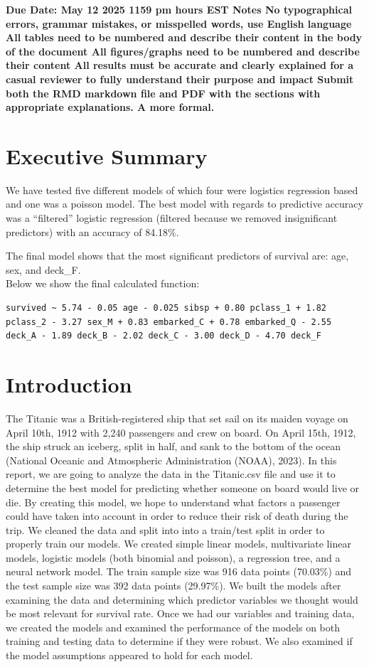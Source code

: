 \documentclass[
  letterpaper,
  DIV=11,
  numbers=noendperiod]{scrartcl}
\begin{document}
\textbf{Due Date: May 12 2025 1159 pm hours EST Notes No typographical
errors, grammar mistakes, or misspelled words, use English language All
tables need to be numbered and describe their content in the body of the
document All figures/graphs need to be numbered and describe their
content All results must be accurate and clearly explained for a casual
reviewer to fully understand their purpose and impact Submit both the
RMD markdown file and PDF with the sections with appropriate
explanations. A more formal.}

\section{Executive Summary}\label{executive-summary}

We have tested five different models of which four were logistics
regression based and one was a poisson model. The best model with
regards to predictive accuracy was a ``filtered'' logistic regression
(filtered because we removed insignificant predictors) with an accuracy
of 84.18\%.

The final model shows that the most significant predictors of survival
are: age, sex, and deck\_F.\\
Below we show the final calculated function:

\begin{verbatim}
survived ~ 5.74 - 0.05 age - 0.025 sibsp + 0.80 pclass_1 + 1.82 pclass_2 - 3.27 sex_M + 0.83 embarked_C + 0.78 embarked_Q - 2.55 deck_A - 1.89 deck_B - 2.02 deck_C - 3.00 deck_D - 4.70 deck_F
\end{verbatim}

\section{Introduction}\label{introduction}

The Titanic was a British-registered ship that set sail on its maiden
voyage on April 10th, 1912 with 2,240 passengers and crew on board. On
April 15th, 1912, the ship struck an iceberg, split in half, and sank to
the bottom of the ocean (National Oceanic and Atmospheric Administration
(NOAA), 2023). In this report, we are going to analyze the data in the
Titanic.csv file and use it to determine the best model for predicting
whether someone on board would live or die. By creating this model, we
hope to understand what factors a passenger could have taken into
account in order to reduce their risk of death during the trip. We
cleaned the data and split into into a train/test split in order to
properly train our models. We created simple linear models, multivariate
linear models, logistic models (both binomial and poisson), a regression
tree, and a neural network model. The train sample size was 916 data
points (70.03\%) and the test sample size was 392 data points (29.97\%).
We built the models after examining the data and determining which
predictor variables we thought would be most relevant for survival rate.
Once we had our variables and training data, we created the models and
examined the performance of the models on both training and testing data
to determine if they were robust. We also examined if the model
assumptions appeared to hold for each model.
\end{document}
